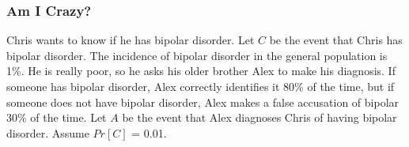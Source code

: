 \documentclass[9pt]{beamer}
\begin{document}
\begin{frame}[fragile]
  \frametitle{Am I Crazy?}
Chris wants to know if he has bipolar disorder. Let $C$ be the event that Chris has bipolar disorder. The incidence of bipolar disorder in the general population is 1\%. He is really poor, so he asks his older brother Alex to make his diagnosis. If someone has bipolar disorder, Alex correctly identifies it 80\% of the time, but if someone does not have bipolar disorder, Alex makes a false accusation of bipolar 30\% of the time. Let $A$ be the event that Alex diagnoses Chris of having bipolar disorder. Assume $Pr[C]$ = 0.01. \\
\begin{enumerate}[(a)]
\\ 
\\ 
\\
\end{enumerate}
\end{frame}
\end{document}
